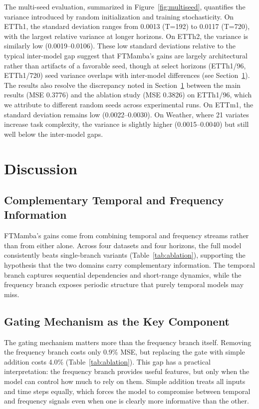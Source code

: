 \documentclass[electronics,article,submit,pdftex,moreauthors]{Definitions/mdpi}
\begin{document}
The multi-seed evaluation, summarized in Figure~\ref{fig:multiseed}, quantifies the variance introduced by random initialization and training stochasticity. On ETTh1, the standard deviation ranges from 0.0013 (T=192) to 0.0117 (T=720), with the largest relative variance at longer horizons. On ETTh2, the variance is similarly low (0.0019--0.0106). These low standard deviations relative to the typical inter-model gap suggest that FTMamba's gains are largely architectural rather than artifacts of a favorable seed, though at select horizons (ETTh1/96, ETTh1/720) seed variance overlaps with inter-model differences (see Section~\ref{sec:discussion}). The results also resolve the discrepancy noted in Section~\ref{sec:discussion} between the main results (MSE 0.3776) and the ablation study (MSE 0.3826) on ETTh1/96, which we attribute to different random seeds across experimental runs. On ETTm1, the standard deviation remains low (0.0022--0.0030). On Weather, where 21 variates increase task complexity, the variance is slightly higher (0.0015--0.0040) but still well below the inter-model gaps.

\section{Discussion}\label{sec:discussion}

\subsection{Complementary Temporal and Frequency Information}

FTMamba's gains come from combining temporal and frequency streams rather than from either alone. Across four datasets and four horizons, the full model consistently beats single-branch variants (Table~\ref{tab:ablation}), supporting the hypothesis that the two domains carry complementary information. The temporal branch captures sequential dependencies and short-range dynamics, while the frequency branch exposes periodic structure that purely temporal models may miss.

\subsection{Gating Mechanism as the Key Component}

The gating mechanism matters more than the frequency branch itself. Removing the frequency branch costs only 0.9\% MSE, but replacing the gate with simple addition costs 4.0\% (Table~\ref{tab:ablation}). This gap has a practical interpretation: the frequency branch provides useful features, but only when the model can control how much to rely on them. Simple addition treats all inputs and time steps equally, which forces the model to compromise between temporal and frequency signals even when one is clearly more informative than the other.
\end{document}
